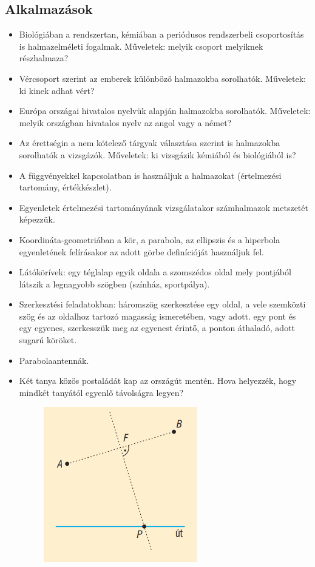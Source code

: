 \documentclass[12pt,a4paper]{article}
\begin{document}
\subsection{Alkalmazások}
\begin{itemize}
\item Biológiában a rendszertan, kémiában a periódusos rendszerbeli csoportosítás is halmazelméleti fogalmak. Műveletek: melyik csoport melyiknek részhalmaza?
\item  Vércsoport szerint az emberek különböző halmazokba sorolhatók. Műveletek: ki kinek adhat vért?
\item Európa országai hivatalos nyelvük alapján halmazokba sorolhatók. Műveletek: melyik országban hivatalos nyelv az angol vagy a német?
\item  Az érettségin a nem kötelező tárgyak választása szerint is halmazokba sorolhatók a vizsgázók. Műveletek: ki vizsgázik kémiából és biológiából is?
\item  A függvényekkel kapcsolatban is használjuk a halmazokat (értelmezési tartomány, értékkészlet).
\item Egyenletek értelmezési tartományának vizsgálatakor számhalmazok metszetét képezzük.
\item Koordináta-geometriában a kör, a parabola, az ellipszis és a hiperbola egyenletének felírásakor az adott görbe definícióját használjuk fel.
\item Látókörívek: egy téglalap egyik oldala a szomszédos oldal mely pontjából látszik a legnagyobb szögben (színház, sportpálya).
\item Szerkesztési feladatokban: háromszög szerkesztése egy oldal, a vele szemközti szög és az oldalhoz tartozó magasság ismeretében, vagy adott. egy pont és egy egyenes, szerkesszük meg az egyenest érintő, a ponton áthaladó, adott sugarú köröket.
\item Parabolaantennák.
\item Két tanya közös postaládát kap az országút mentén. Hova helyezzék, hogy mindkét tanyától egyenlő távolságra legyen?
\begin{figure}[h]
\centering
\includegraphics[scale=0.2]{img/postaladak_helye}
\end{figure}
\end{itemize}
\end{document}
